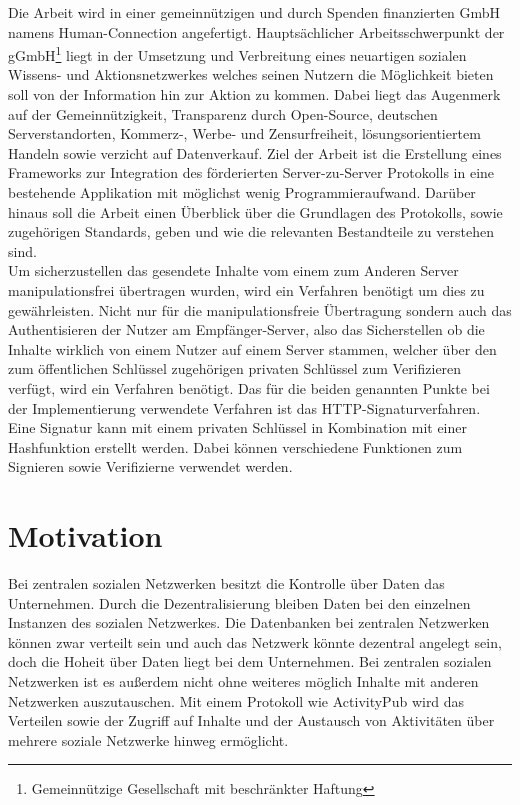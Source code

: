 {	Die Arbeit wird in einer gemeinnützigen und durch Spenden finanzierten GmbH namens Human-Connection angefertigt. Hauptsächlicher Arbeitsschwerpunkt der gGmbH\footnote{Gemeinnützige Gesellschaft mit beschränkter Haftung} liegt in der Umsetzung und Verbreitung eines neuartigen sozialen Wissens- und Aktionsnetzwerkes welches seinen Nutzern die Möglichkeit bieten soll von der Information hin zur Aktion zu kommen. Dabei liegt das Augenmerk auf der Gemeinnützigkeit, Transparenz durch Open-Source, deutschen Serverstandorten, Kommerz-, Werbe- und Zensurfreiheit, lösungsorientiertem Handeln sowie verzicht auf Datenverkauf. Ziel der Arbeit ist die Erstellung eines Frameworks zur Integration des förderierten Server-zu-Server Protokolls in eine bestehende Applikation mit möglichst wenig Programmieraufwand. Darüber hinaus soll die Arbeit einen Überblick über die Grundlagen des Protokolls, sowie zugehörigen Standards, geben und wie die relevanten Bestandteile zu verstehen sind.\\
	
	Um sicherzustellen das gesendete Inhalte vom einem zum Anderen Server manipulationsfrei übertragen wurden, wird ein Verfahren benötigt um dies zu gewährleisten. Nicht nur für die manipulationsfreie Übertragung sondern auch das Authentisieren der Nutzer am Empfänger-Server, also das Sicherstellen ob die Inhalte wirklich von einem Nutzer auf einem Server stammen, welcher über den zum öffentlichen Schlüssel zugehörigen privaten Schlüssel zum Verifizieren verfügt, wird ein Verfahren benötigt. Das für die beiden genannten Punkte bei der Implementierung verwendete Verfahren ist das HTTP-Signaturverfahren. Eine Signatur kann mit einem privaten Schlüssel in Kombination mit einer Hashfunktion erstellt werden. Dabei können verschiedene Funktionen zum Signieren sowie Verifizierne verwendet werden.
	
	\section{Motivation}
	\label{sec:Introduction:Motivation}
	Bei zentralen sozialen Netzwerken besitzt die Kontrolle über Daten das Unternehmen. Durch die Dezentralisierung bleiben Daten bei den einzelnen Instanzen des sozialen Netzwerkes. Die Datenbanken bei zentralen Netzwerken können zwar verteilt sein und auch das Netzwerk könnte dezentral angelegt sein, doch die Hoheit über Daten liegt bei dem Unternehmen. Bei zentralen sozialen Netzwerken ist es außerdem nicht ohne weiteres möglich Inhalte mit anderen Netzwerken auszutauschen. Mit einem Protokoll wie ActivityPub wird das Verteilen sowie der Zugriff auf Inhalte und der Austausch von Aktivitäten über mehrere soziale Netzwerke hinweg ermöglicht.\\
	
}
